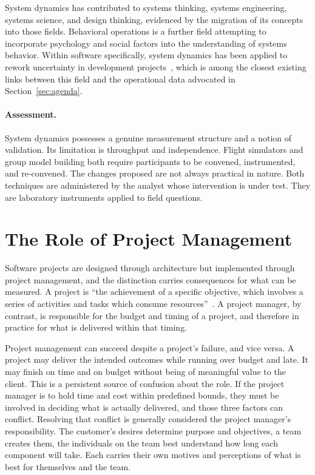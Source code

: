 \documentclass{csimq}
\begin{document}
System dynamics has contributed to systems thinking, systems engineering,
systems science, and design thinking, evidenced by the migration of its concepts
into those fields. Behavioral operations is a further field attempting to
incorporate psychology and social factors into the understanding of systems
behavior. Within software specifically, system dynamics has been applied to
rework uncertainty in development projects~\cite{khatun2023}, which is among
the closest existing links between this field and the operational data
advocated in Section~\ref{sec:agenda}.

\paragraph{Assessment.} System dynamics possesses a genuine measurement structure and a notion
of validation. Its limitation is throughput and independence. Flight simulators
and group model building both require participants to be convened, instrumented,
and re-convened. The changes proposed are not always practical in nature.
Both techniques are administered by the analyst whose intervention is under test. They are
laboratory instruments applied to field questions.

\section{The Role of Project Management}
\label{sec:pm}

Software projects are designed through architecture but implemented through
project management, and the distinction carries consequences for what can be
measured. A project is ``the achievement of a specific objective, which involves
a series of activities and tasks which consume resources''~\cite{munns1996}. A
project manager, by contrast, is responsible for the budget and timing of a
project, and therefore in practice for what is delivered within that timing.

Project management can succeed despite a project's failure, and vice versa. A
project may deliver the intended outcomes while running over budget and late. It
may finish on time and on budget without being of meaningful value to the
client. This is a persistent source of confusion about the role. If the project
manager is to hold time and cost within predefined bounds, they must be involved
in deciding what is actually delivered, and those three factors can conflict.
Resolving that conflict is generally considered the project manager's
responsibility. The customer's desires determine purpose and objectives, a team
creates them, the individuals on the team best understand how long each
component will take. Each carries their own motives and perceptions of what
is best for themselves and the team.
\end{document}
